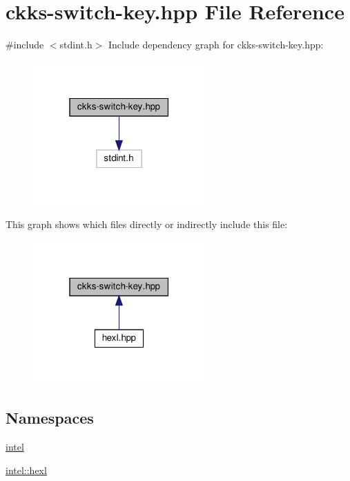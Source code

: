\hypertarget{ckks-switch-key_8hpp}{}\section{ckks-\/switch-\/key.hpp File Reference}
\label{ckks-switch-key_8hpp}
{\ttfamily \#include $<$stdint.\+h$>$}\newline
Include dependency graph for ckks-\/switch-\/key.hpp\+:
\nopagebreak
\begin{figure}[H]
\begin{center}
\leavevmode
\includegraphics[width=187pt]{ckks-switch-key_8hpp__incl}
\end{center}
\end{figure}
This graph shows which files directly or indirectly include this file\+:
\nopagebreak
\begin{figure}[H]
\begin{center}
\leavevmode
\includegraphics[width=187pt]{ckks-switch-key_8hpp__dep__incl}
\end{center}
\end{figure}
\subsection*{Namespaces}
\begin{DoxyCompactItemize}
\item 
 \hyperlink{namespaceintel}{intel}
\item 
 \hyperlink{namespaceintel_1_1hexl}{intel\+::hexl}
\end{DoxyCompactItemize}
